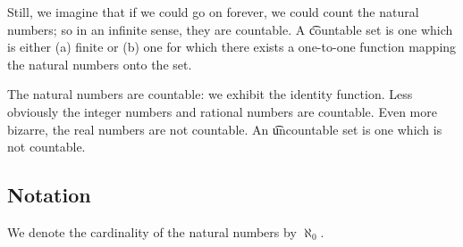 Still, we imagine that if we could go on forever, we could count
the natural numbers; so in an infinite sense, they are countable.
A \t{countable} set is one which is either (a) finite or
(b) one for which there exists a one-to-one function mapping
the natural numbers onto the set.

The natural numbers are countable: we exhibit the identity function.
Less obviously the integer numbers and rational numbers are countable.
Even more bizarre, the real numbers are not countable.
An \t{uncountable} set is one which is not countable.

\subsection*{Notation}

We denote the cardinality of the natural numbers by $\aleph_0$.
